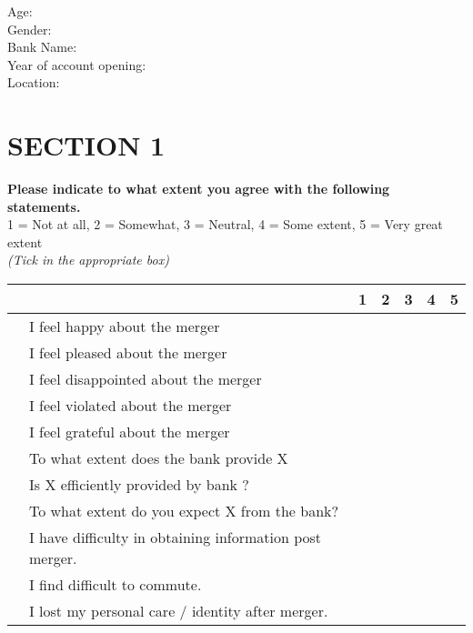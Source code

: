 \documentclass[10pt,a4paper]{article}
\newcounter{magicrownumbers}
\newcommand\rownumber{\stepcounter{magicrownumbers}\arabic{magicrownumbers}}
\newcommand \tab[1][1cm]{\hspace*{#1}}
\begin{document}
\begin{center}
\end{center}
Age:\\
Gender:\\
Bank Name:\\
Year of account opening:\\
Location:\\
\noindent\makebox[\linewidth]{\rule{\paperwidth}{0.4pt}}
{\selectfont
\section*{SECTION 1}
\textbf{Please indicate to what extent you agree with the following statements.} \\
1 = Not at all, 2 = Somewhat, 3 = Neutral, 4 = Some extent, 5 = Very great extent\\
\emph {(Tick in the appropriate box)}\\
\begin{minipage}{\textwidth}

\begin{tabular}{|c|l|c|c|c|c|c|}
\hline \multicolumn{2}{|c|}{} & 1 & 2 & 3 & 4 & 5\\
\hline \rownumber & I feel happy about the merger & \tab & \tab & \tab & \tab & \tab \\
\hline \rownumber & I feel pleased about the merger & \tab & \tab & \tab & \tab & \tab \\
\hline \rownumber & I feel disappointed about the merger & \tab & \tab & \tab & \tab & \tab \\
\hline \rownumber & I feel violated about the merger & \tab & \tab & \tab & \tab & \tab \\
\hline \rownumber & I feel grateful about the merger & \tab & \tab & \tab & \tab & \tab \\
\hline \rownumber & To what extent does the bank provide X  & \tab & \tab & \tab & \tab & \tab \\
\hline \rownumber & Is X efficiently provided by bank ? & \tab & \tab & \tab & \tab & \tab \\
\hline \rownumber & To what extent do you expect X from the bank? & \tab & \tab & \tab & \tab & \tab \\
\hline \rownumber & I have difficulty in obtaining information post merger. & \tab & \tab & \tab & \tab & \tab \\
\hline \rownumber & I find difficult to commute. & \tab & \tab & \tab & \tab & \tab \\
\hline \rownumber & I lost my personal care / identity after merger. & \tab & \tab & \tab & \tab & \tab \\
\hline
\end{tabular}


\end{minipage}}
\end{document}
